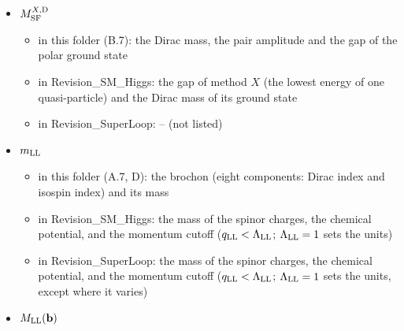 \documentclass[
  10pt,
]{article}
\providecommand{\tightlist}{%
  \setlength{\itemsep}{0pt}\setlength{\parskip}{0pt}}
\begin{document}
\begin{itemize}
  \begin{itemize}
  \tightlist
  \item
    in this folder (A.7): the mass, the chemical potential, the coupling
    and the momentum cutoff
  \item
    in Revision\_SM\_Higgs: the mass of the spinor charges, the chemical
    potential, and the momentum cutoff (\(q_{\rm LL}<\Lambda_{\rm LL}\);
    \(\Lambda_{\rm LL}=1\) sets the units)
  \item
    in Revision\_SuperLoop: the mass of the spinor charges, the chemical
    potential, and the momentum cutoff (\(q_{\rm LL}<\Lambda_{\rm LL}\);
    \(\Lambda_{\rm LL}=1\) sets the units, except where it varies)
  \end{itemize}
\item
  \(M^{X,{\rm D}}_{\rm SF}\)

  \begin{itemize}
  \tightlist
  \item
    in this folder (B.7): the Dirac mass, the pair amplitude and the gap
    of the polar ground state
  \item
    in Revision\_SM\_Higgs: the gap of method \(X\) (the lowest energy
    of one quasi-particle) and the Dirac mass of its ground state
  \item
    in Revision\_SuperLoop: -- (not listed)
  \end{itemize}
\item
  \(m_{\rm LL}\)

  \begin{itemize}
  \tightlist
  \item
    in this folder (A.7, D): the brochon (eight components: Dirac index
    and isospin index) and its mass
  \item
    in Revision\_SM\_Higgs: the mass of the spinor charges, the chemical
    potential, and the momentum cutoff (\(q_{\rm LL}<\Lambda_{\rm LL}\);
    \(\Lambda_{\rm LL}=1\) sets the units)
  \item
    in Revision\_SuperLoop: the mass of the spinor charges, the chemical
    potential, and the momentum cutoff (\(q_{\rm LL}<\Lambda_{\rm LL}\);
    \(\Lambda_{\rm LL}=1\) sets the units, except where it varies)
  \end{itemize}
\item
  \(M_{\rm LL}(\mathbf b)\)


\end{itemize}
\end{document}
